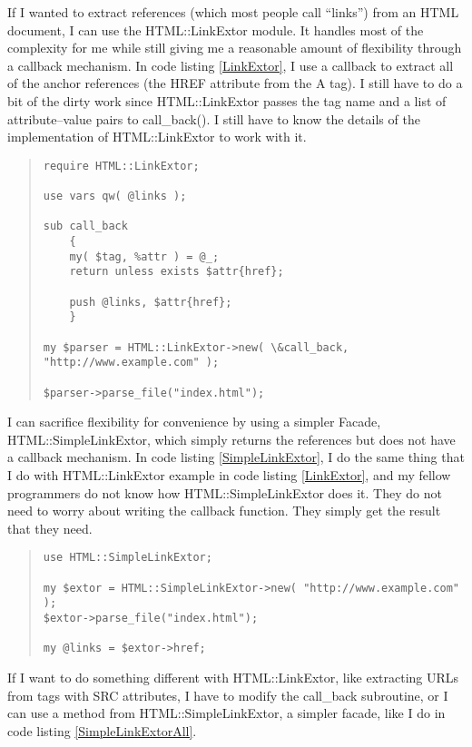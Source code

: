 If I wanted to extract references (which most people call ``links'')
from an HTML document, I can use the HTML::LinkExtor module. It
handles most of the complexity for me while still giving me a
reasonable amount of flexibility through a callback mechanism. In code
listing \ref{LinkExtor}, I use a callback to extract all of the anchor
references (the HREF attribute from the A tag).  I still have to do a
bit of the dirty work since HTML::LinkExtor passes the tag name and a
list of attribute--value pairs to call\_back().  I still have to know
the details of the implementation of HTML::LinkExtor to work with it.


\begin{quote}
\begin{verbatim}
require HTML::LinkExtor;

use vars qw( @links );

sub call_back 
	{
	my( $tag, %attr ) = @_;
	return unless exists $attr{href};
	
	push @links, $attr{href};
	}
	
my $parser = HTML::LinkExtor->new( \&call_back, "http://www.example.com" );

$parser->parse_file("index.html");
\end{verbatim}
\end{quote}

I can sacrifice flexibility for convenience by using a simpler Facade,
HTML::SimpleLinkExtor, which simply returns the references but does
not have a callback mechanism.  In code listing \ref{SimpleLinkExtor},
I do the same thing that I do with HTML::LinkExtor example in code
listing \ref{LinkExtor}, and my fellow programmers do not know
how HTML::SimpleLinkExtor does it.  They do not need to worry about
writing the callback function. They simply get the result that they
need.

\begin{quote}
\begin{verbatim}
use HTML::SimpleLinkExtor;

my $extor = HTML::SimpleLinkExtor->new( "http://www.example.com" );
$extor->parse_file("index.html");

my @links = $extor->href;
\end{verbatim}
\end{quote}

If I want to do something different with HTML::LinkExtor, like
extracting URLs from tags with SRC attributes, I have
to modify the call\_back subroutine, or I can  use
a method from HTML::SimpleLinkExtor, a simpler facade, like I do in code
listing \ref{SimpleLinkExtorAll}.


